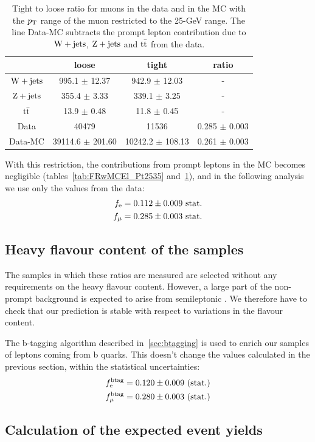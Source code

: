 \begin{table}[htb]
    \centering
\begin{tabular}{*4c}
    \toprule
 & 	 loose & 	 tight & 	 ratio \\
 \midrule
$\mathrm{W} + \text{jets}$ & 	995.1 $\pm$ 12.37 & 	942.9 $\pm$ 12.03 & 	- \\
$\mathrm{Z} + \text{jets}$ & 	355.4 $\pm$ 3.33 & 	339.1 $\pm$ 3.25 & 	- \\
$\mathrm{t}\bar{\mathrm{t}}$ & 	13.9 $\pm$ 0.48 & 	11.8 $\pm$ 0.45 & 	- \\
\midrule
Data & 	40479 & 	11536 & 	0.285 $\pm$ 0.003 \\
Data-MC &	39114.6 $\pm$ 201.60 & 	10242.2 $\pm$ 108.13 & 	0.261 $\pm$ 0.003 \\
\bottomrule
\end{tabular}
\caption{Tight to loose ratio for muons in the data and in the MC with the
    $p_\mathrm{T}$ range of the muon restricted to the 25-\unit[35]{GeV} range. 
The line Data-MC subtracts the prompt lepton contribution due to $\mathrm{W} + \text{jets}$,
$\mathrm{Z} + \text{jets}$ and $\mathrm{t}\bar{\mathrm{t}}$ from the data.}
\label{tab:FRwMCMu_Pt2535}
\end{table}

With this \pt restriction, the contributions from prompt leptons in the MC
becomes negligible (tables~\ref{tab:FRwMCEl_Pt2535}
and~\ref{tab:FRwMCMu_Pt2535}), and in the following analysis we use only the values
from the data:
\begin{align*}
    f_{\mathrm{e}} &= 0.112 \pm 0.009 \text{ stat.}\\
    f_{\mu} &= 0.285 \pm 0.003 \text{ stat.}
\end{align*}

\subsection{Heavy flavour content of the samples}
The samples in which these ratios are measured are selected without any
requirements on the heavy flavour content. However, a large part of the
non-prompt background is expected to arise from semileptonic \ttbar. We
therefore have to check that our prediction is stable with respect to
variations in the flavour content.

The b-tagging algorithm described in~\ref{sec:btagging} is used to enrich
our samples of leptons coming from b quarks. This doesn't change the values
calculated in the previous section, within the statistical uncertainties:
\begin{align*}
    f_{\mathrm{e}}^{\text{btag}} &= 0.120 \pm 0.009 \text{ (stat.)}\\
    f_{\mu}^{\text{btag}} &= 0.280 \pm 0.003 \text{ (stat.)}
\end{align*}

\subsection{Calculation of the expected event yields}
